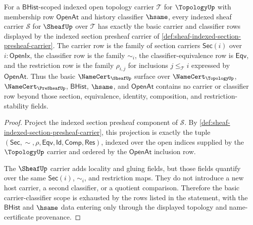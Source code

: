 \begin{theorem}
\label{thm:sheaf-basic-carrier-classifier-scope}
For a $\mathsf{BHist}$-scoped indexed open topology carrier $\mathcal{T}$ for $\TopologyUp$ with membership row $\mathsf{OpenAt}$ and history classifier $\hsame$, every indexed sheaf carrier $\mathcal{S}$ for $\SheafUp$ over $\mathcal{T}$ has exactly the basic carrier and classifier rows displayed by the indexed section presheaf carrier of \autoref{def:sheaf-indexed-section-presheaf-carrier}. The carrier row is the family of section carriers $\mathsf{Sec}(i)$ over $i:\mathsf{OpenIx}$, the classifier row is the family $\sim_i$, the classifier-equivalence row is $\mathsf{Eqv}$, and the restriction row is the family $\rho_{i,j}$ for inclusions $j\le_{\mathcal{T}}i$ expressed by $\mathsf{OpenAt}$. Thus the basic $\NameCert_{\SheafUp}$ surface over $\NameCert_{\TopologyUp}$, $\NameCert_{\PreSheafUp}$, $\mathsf{BHist}$, $\hsame$, and $\mathsf{OpenAt}$ contains no carrier or classifier row beyond those section, equivalence, identity, composition, and restriction-stability fields.
\end{theorem}
\begin{proof}
Project the indexed section presheaf component of $\mathcal{S}$. By \autoref{def:sheaf-indexed-section-presheaf-carrier}, this projection is exactly the tuple $(\mathsf{Sec},\sim,\rho,\mathsf{Eqv},\mathsf{Id},\mathsf{Comp},\mathsf{Res})$, indexed over the open indices supplied by the $\TopologyUp$ carrier and ordered by the $\mathsf{OpenAt}$ inclusion row.

The $\SheafUp$ carrier adds locality and gluing fields, but those fields quantify over the same $\mathsf{Sec}(i)$, $\sim_i$, and restriction maps. They do not introduce a new host carrier, a second classifier, or a quotient comparison. Therefore the basic carrier-classifier scope is exhausted by the rows listed in the statement, with the $\mathsf{BHist}$ and $\hsame$ data entering only through the displayed topology and name-certificate provenance.
\end{proof}

